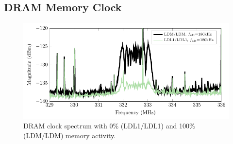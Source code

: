 \subsection{DRAM Memory Clock}
%

\begin{figure}[t]
\centering
\includegraphics[trim=0.1in 0.10in 0.1in 0.09in,clip,width=5in]{../fase/Data/lx61_mem_ssc_a.pdf}
\caption{DRAM clock spectrum with 0\% (LDL1/LDL1) and 100\% (LDM/LDM) memory activity.}
\label{lx61_mem_ssc_a}
\end{figure}

